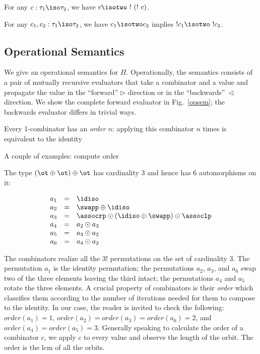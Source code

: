 \begin{proposition}
For any $c : \tau_1 \iso \tau_2$, we have $c \isotwo ~!~(!~c)$.
\end{proposition} 

\begin{proposition}
For any $c_1,c_2 : \tau_1 \iso \tau_2$, we have $c_1 \isotwo c_2$ implies
$!c_1 \isotwo ~!c_2$.
\end{proposition} 

\subsection{Operational Semantics}

We give an operational semantics for $\Pi$.  Operationally, the
semantics consists of a pair of mutually recursive evaluators that
take a combinator and a value and propagate the value in the
``forward'' $\triangleright$ direction or in the
``backwards''~$\triangleleft$ direction. We show the complete forward
evaluator in Fig.~\ref{opsem}; the backwards evaluator differs in
trivial ways.

Every 1-combinator has an \emph{order} $n$: applying this combinator $n$ times is equivalent to the identity

A couple of examples: compute order

The type $(\ot \oplus \ot) \oplus \ot$ has cardinality 3 and hence has
6 automorphisms on it:

\[\begin{array}{rcl}
a_1 &=& \idiso \\
a_2 &=& \swapp \oplus \idiso \\
a_3 &=& \assocrp \odot (\idiso \oplus \swapp) \odot \assoclp \\
a_4 &=& a_2 \odot a_3 \\
a_5 &=& a_3 \odot a_2 \\
a_6 &=& a_4 \odot a_2
\end{array}\]

The combinators realize all the 3! permutations on the set of
cardinality 3. The permutation $a_1$ is the identity permutation; the
permutations $a_2$, $a_3$, and $a_6$ swap two of the three elements
leaving the third intact; the permutations $a_4$ and $a_5$ rotate the
three elements. A crucial property of combinators is their
\emph{order} which classifies them according to the number of
iterations needed for them to compose to the identity. In our case,
the reader is invited to check the following: $\mathit{order}(a_1)=1$,
$\mathit{order}(a_2)=\mathit{order}(a_3)=\mathit{order}(a_6)=2$, and
$\mathit{order}(a_4)=\mathit{order}(a_5)=3$. Generally speaking to
calculate the order of a combinator $c$, we apply $c$ to every value
and observe the length of the orbit. The order is the lcm of all the
orbits.

